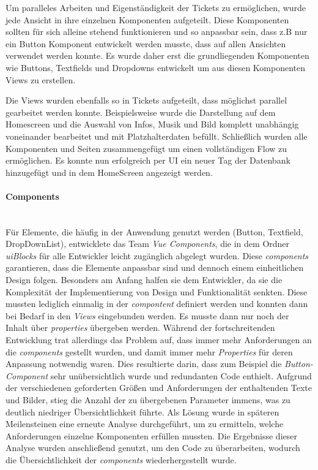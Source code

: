 \documentclass[10pt, a4paper]{article}
\begin{document}
Um paralleles Arbeiten und Eigenständigkeit der Tickets zu ermöglichen, wurde jede Ansicht in ihre einzelnen Komponenten aufgeteilt.
Diese Komponenten sollten für sich alleine stehend funktionieren und so anpassbar sein, dass z.B nur ein Button Komponent entwickelt werden musste, dass auf
allen Ansichten verwendet werden konnte. Es wurde daher erst die grundliegenden Komponenten wie Buttons, Textfields und Dropdowns entwickelt um aus diesen
Komponenten Views zu erstellen.

Die Views wurden ebenfalls so in Tickets aufgeteilt, dass möglichst parallel gearbeitet werden konnte.
Beispielsweise wurde die Darstellung auf dem Homescreen und die Auswahl von Infos, Musik und Bild komplett unabhängig voneinander bearbeitet und mit Platzhalterdaten befüllt.
Schließlich wurden alle Komponenten und Seiten zusammengefügt um einen vollständigen Flow zu ermöglichen.
Es konnte nun erfolgreich per UI ein neuer Tag der Datenbank hinzugefügt und in dem HomeScreen angezeigt werden.

\paragraph*{Components}$~$ \\
Für Elemente, die häufig in der Anwendung genutzt werden (Button, Textfield, DropDownList),
entwicklete das Team \textit{Vue Components}, die in dem Ordner \textit{uiBlocks} für alle Entwickler leicht zugänglich abgelegt wurden.
Diese \textit{components} garantieren, dass die Elemente anpassbar sind und dennoch einem einheitlichen Design folgen.
Besonders am Anfang halfen sie dem Entwickler, da sie die Komplexität der Implementierung von Design und Funktionalität senkten.
Diese mussten lediglich einmalig in der \textit{compontent} definiert werden und konnten dann bei Bedarf in den \textit{Views} eingebunden werden.
Es musste dann nur noch der Inhalt über \textit{properties} übergeben werden.
Während der fortschreitenden Entwicklung trat allerdings das Problem auf, dass immer mehr Anforderungen an die \textit{components} gestellt wurden,
 und damit immer mehr \textit{Properties} für deren Anpassung notwendig waren.
 Dies resultierte darin, dass zum Beispiel die \textit{Button-Component} sehr unübersichtlich wurde und redundanten Code enthielt.
Aufgrund der verschiedenen geforderten Größen und Anforderungen der enthaltenden Texte und Bilder,
 stieg die Anzahl der zu übergebenen Parameter immens, was zu deutlich niedriger Übersichtlichkeit führte.
Als Lösung wurde in späteren Meilensteinen eine erneute Analyse durchgeführt, um zu ermitteln, welche Anforderungen einzelne Komponenten erfüllen mussten.
Die Ergebnisse dieser Analyse wurden anschließend genutzt, um den Code zu überarbeiten, wodurch die Übersichtlichkeit der \textit{components} wiederhergestellt wurde.
\end{document}
